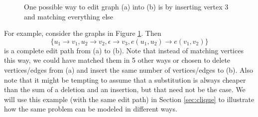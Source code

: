 \documentclass{article}
\theoremstyle{definition}
\begin{document}
\begin{figure}
  \begin{subfigure}[t]{0.25\textwidth}
    \centering
    \caption{}
  \end{subfigure}
  \begin{subfigure}[t]{0.25\textwidth}
    \centering
    \caption{}
  \end{subfigure}
  \caption{One possible way to edit graph (a) into (b) is by inserting vertex 3 and matching everything else}
  \label{fig:example}
\end{figure}
For example, consider the graphs in Figure \ref{fig:example}. Then
\begin{equation}
\{ u_1 \to v_1, u_2 \to v_2, \epsilon \to v_3, e(u_1, u_2) \to e(v_1, v_2) \} \label{eqn:1} \tag{$\star$}
\end{equation}
is a complete edit path from (a) to (b). Note that instead of matching vertices this way, we could have matched them in 5 other ways or chosen to delete vertices/edges from (a) and insert the same number of vertices/edges to (b). Also note that it might be tempting to assume that a substitution is always cheaper than the sum of a deletion and an insertion, but that need not be the case. We will use this example (with the same edit path) in Section \ref{sec:clique} to illustrate how the same problem can be modeled in different ways.
\end{document}
